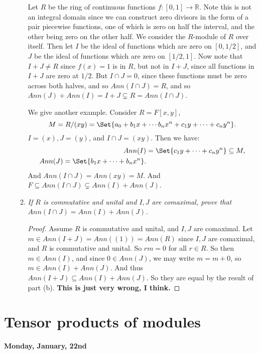 \documentclass[9pt,reqno,twoside]{amsbook}
\theoremstyle{plain}
\numberwithin{section}{chapter}
\numberwithin{equation}{chapter}
\theoremstyle{definition}
\theoremstyle{remark}
\theoremstyle{plain}
\newcommand{\sub}{\subseteq}
\newcommand{\R}{\mathbb{R}}
\newcommand{\bee}{\begin{equation}\begin{aligned}}
\newcommand{\eee}{\end{aligned}\end{equation}}
\begin{document}
\begin{enumerate}[label=\arabic*.]
\begin{enumerate}
 Let $R$ be the ring of continuous functions $f:[0,1] \to \R$. Note this is not an integral domain since we can construct zero divisors in the form of a pair piecewise functions, one of which is zero on half the interval, and the other being zero on the other half. We consider the $R$-module of $R$ over itself. Then let $I$ be the ideal of functions which are zero on $[0,1/2]$, and $J$ be the ideal of functions which are zero on $[1/2,1]$. Now note that $I + J \neq R$ since $f(x) = 1$ is in $R$, but not in $I + J$, since all functions in $I + J$ are zero at $1/2$. But $I \cap J = 0$, since these functions must be zero across both halves, and so $Ann(I \cap J) = R$, and so $Ann(J) + Ann(I) = I + J \subsetneq R = Ann(I \cap J)$. 
 
 We give another example. Consider $R = F[x,y]$, 
 $$
 M = R/(xy) = \Set{a_0 + b_1x + \cdots b_nx^n + c_1y + \cdots + c_ny^n}.
 $$ 
 $I = (x),J = (y)$, and $I \cap J = (xy)$. Then we have: 
\bee
Ann(I) &= \Set{c_1y + \cdots + c_ny^n} \sub M,\\
Ann(J) = \Set{b_1x + \cdots + b_nx^n}.
\eee
And $Ann(I \cap J) = Ann(xy) = M$. And $F \sub Ann(I \cap J) \subsetneq Ann(I) + Ann(J)$. 
 
 \item \textit{If $R$ is commutative and unital and $I,J$ are comaximal, prove that $Ann(I \cap J) = Ann(I) + Ann(J)$. }
 
 \begin{proof}
 Assume $R$ is commutative and unital, and $I,J$ are comaximal. 
 Let $m \in Ann(I + J) = Ann((1)) = Ann(R)$ since $I,J$ are comaximal, and $R$ is commutative and unital. So $rm = 0$ for all $r \in R$. So then $m \in Ann(I)$, and since $0 \in Ann(J)$, we may write $m = m + 0$, so $m \in Ann(I) + Ann(J)$. And thus $Ann(I + J) \sub Ann(I) + Ann(J)$. So they are equal by the result of part (b). \textbf{This is just very wrong, I think. }
 \end{proof}
\end{enumerate}  

\end{enumerate}

\section{Tensor products of modules}

\textbf{Monday, January, 22nd}
\end{document}
